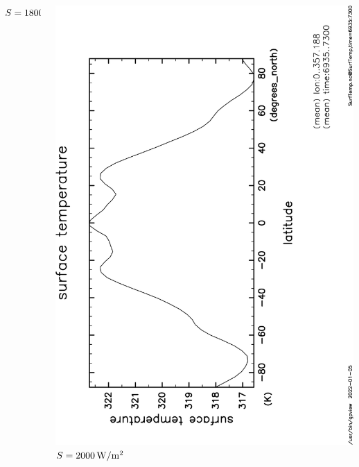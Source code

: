 \documentclass[aspectratio=149,9pt,fleqn]{beamer}
\begin{document}
\begin{frame}
\begin{columns}[T]
\begin{column}{.3\textwidth}
			\(S=1800\hmu{W/m^2}\)
		\end{column}
		\begin{column}{.3\textwidth}
			\centering
			\includegraphics[height=\textwidth,angle=-90]{S2000/SurfTemp,time=6935:7300-crop.pdf}
			\(S=2000\hmu{W/m^2}\)
		\end{column}
	\end{columns}
\end{frame}
\end{document}
